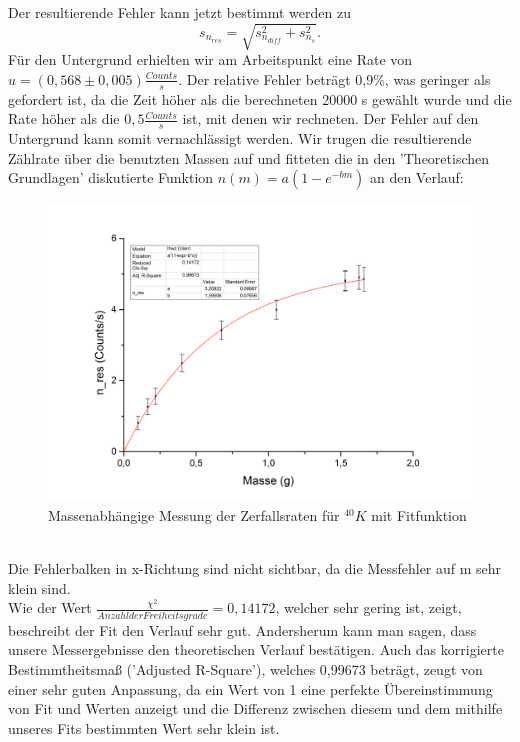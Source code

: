  Der resultierende Fehler kann jetzt bestimmt werden zu \[s_{n_{res}}=\sqrt{s_{n_{diff}}^{2}+s_{n_{s}}^{2}}.\]
 Für den Untergrund erhielten wir am Arbeitspunkt eine Rate von $u=(0,568\pm0,005)\frac{Counts}{s}$. Der relative Fehler beträgt 0,9\%, was geringer als gefordert ist, da die Zeit höher als die berechneten 20000 s gewählt wurde und die Rate höher als die $0,5 \frac{Counts}{s}$ ist, mit denen wir rechneten. Der Fehler auf den Untergrund kann somit vernachlässigt werden.
 \clearpage
 Wir trugen die resultierende Zählrate über die benutzten Massen auf und fitteten die in den 'Theoretischen Grundlagen' diskutierte Funktion $n(m)=a(1-e^{-bm})$ an den Verlauf:
 \begin{figure}[h]
 \begin{center}
 \includegraphics[scale=0.6]{Bilder/kalium}
 \caption{Massenabhängige Messung der Zerfallsraten für $^{40}K$ mit Fitfunktion}
 \end{center}
 \end{figure}
 ~\\
 Die Fehlerbalken in x-Richtung sind nicht sichtbar, da die Messfehler auf m sehr klein sind.\\
 Wie der Wert $\frac{\chi^{2}}{Anzahl der Freiheitsgrade}=0,14172$, welcher sehr gering ist, zeigt, beschreibt der Fit den Verlauf sehr gut. Andersherum kann man sagen, dass unsere Messergebnisse den theoretischen Verlauf bestätigen. Auch das korrigierte Bestimmtheitsmaß ('Adjusted R-Square'), welches 0,99673 beträgt, zeugt von einer sehr guten Anpassung, da ein Wert von 1 eine perfekte Übereinstimmung von Fit und Werten anzeigt und die Differenz zwischen diesem und dem mithilfe unseres Fits bestimmten Wert sehr klein ist. \\
